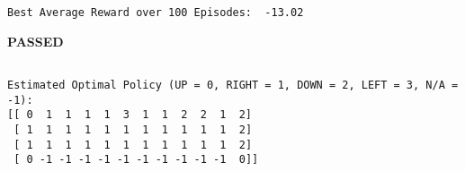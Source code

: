 \documentclass[11pt]{article}
\begin{document}
    \begin{Verbatim}[commandchars=\\\{\}]
Best Average Reward over 100 Episodes:  -13.02

    \end{Verbatim}

    \textbf{{PASSED}}

    
    \begin{Verbatim}[commandchars=\\\{\}]

Estimated Optimal Policy (UP = 0, RIGHT = 1, DOWN = 2, LEFT = 3, N/A = -1):
[[ 0  1  1  1  1  3  1  1  2  2  1  2]
 [ 1  1  1  1  1  1  1  1  1  1  1  2]
 [ 1  1  1  1  1  1  1  1  1  1  1  2]
 [ 0 -1 -1 -1 -1 -1 -1 -1 -1 -1 -1  0]]

    \end{Verbatim}

    \begin{center}
    \end{center}
    { \hspace*{\fill} \\}
    

    
    
    
    
\end{document}
